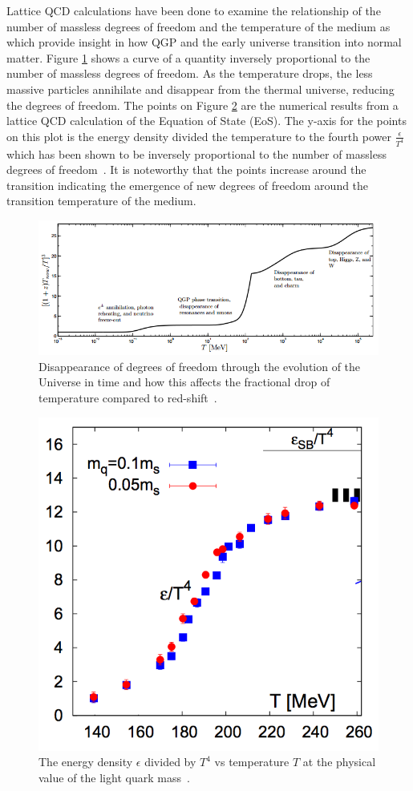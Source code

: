 Lattice QCD calculations have been done to examine the relationship of the number of massless degrees of freedom and the temperature of the medium as which provide insight in how QGP and the early universe transition into normal matter. Figure \ref{fig:lattice_degrees} shows a curve of a quantity inversely proportional to the number of massless degrees of freedom. As the temperature drops, the less massive particles annihilate and disappear from the thermal universe, reducing the degrees of freedom. The points on Figure \ref{fig:lattice_degrees_calc} are the numerical results from a lattice QCD calculation of the Equation of State (EoS). The y-axis for the points on this plot is the energy density divided the temperature to the fourth power $\frac{\epsilon}{T^4}$ which has been shown to be inversely proportional to the number of massless degrees of freedom~\cite{PhysRevD.81.054504}. It is noteworthy that the points increase around the transition indicating the emergence of new degrees of freedom around the transition temperature of the medium.

\begin{figure}[!ht]
\centering
\includegraphics[width=0.55\linewidth]{figs/lattice_degrees_plot.PNG}
\caption{Disappearance of degrees of freedom through the evolution of the Universe in time
and how this affects the fractional drop of temperature compared to red-shift~\cite{1742-6596-509-1-012014}.}
\label{fig:lattice_degrees}
\end{figure}

\begin{figure}[!ht]
\centering
\includegraphics[width=0.55\linewidth]{figs/lattice_degrees_calculation.png}
\caption{The energy density $\epsilon$ divided by $T^4$ vs temperature $T$ at the physical value of the light quark mass~\cite{PhysRevD.81.054504}.}
\label{fig:lattice_degrees_calc}
\end{figure}

